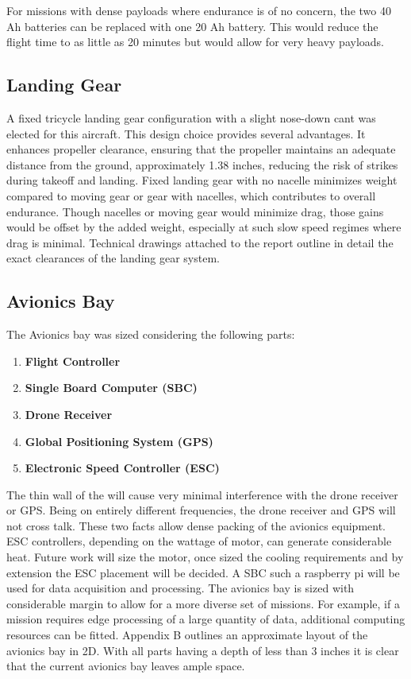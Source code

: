 \documentclass[12pt]{article}
\begin{document}
	For missions with dense payloads where endurance is of no concern, the two 40 Ah batteries can be replaced with one 20 Ah battery. This would reduce the flight time to as little as 20 minutes but would allow for very heavy payloads.
	
	\subsection{Landing Gear}
	A fixed tricycle landing gear configuration with a slight nose-down cant was elected for this aircraft. This design choice provides several advantages. It enhances propeller clearance, ensuring that the propeller maintains an adequate distance from the ground, approximately 1.38 inches, reducing the risk of strikes during takeoff and landing. Fixed landing gear with no nacelle minimizes weight compared to moving gear or gear with nacelles, which contributes to overall endurance. Though nacelles or moving gear would minimize drag, those gains would be offset by the added weight, especially at such slow speed regimes where drag is minimal. Technical drawings attached to the report outline in detail the exact clearances of the landing gear system.
	\newpage
	\subsection{Avionics Bay}
	The Avionics bay was sized considering the following parts:
	\begin{enumerate}
		\item \textbf{Flight Controller}
		\item \textbf{Single Board Computer (SBC)}
		\item  \textbf{Drone Receiver}
		\item \textbf{Global Positioning System (GPS)}
		\item \textbf{Electronic Speed Controller (ESC)}
	\end{enumerate}
	The thin wall of the will cause very minimal interference with the drone receiver or GPS. Being on entirely different frequencies, the drone receiver and GPS will not cross talk. These two facts allow dense packing of the avionics equipment. ESC controllers, depending on the wattage of motor, can generate considerable heat. Future work will size the motor, once sized the cooling requirements and by extension the ESC placement will be decided. A SBC such a raspberry pi will be used for data acquisition and processing. The avionics bay is sized with considerable margin to allow for a more diverse set of missions. For example, if a mission requires edge processing of a large quantity of data, additional computing resources can be fitted. Appendix B outlines an approximate layout of the avionics bay in 2D. With all parts having a depth of less than 3 inches it is clear that the current avionics bay leaves ample space.
	
\end{document}

